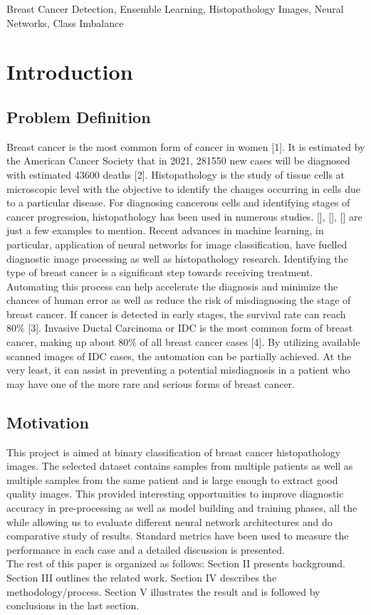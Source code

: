 \documentclass[conference]{IEEEtran}
\begin{document}
\begin{IEEEkeywords}
  Breast Cancer Detection, Ensemble Learning, Histopathology Images,
  Neural Networks, Class Imbalance
\end{IEEEkeywords}

\section{Introduction}
\subsection{Problem Definition}
Breast cancer is the most common form of cancer in women [1]. It is estimated
by the American Cancer Society that in 2021, 281550 new cases will be diagnosed
with estimated 43600 deaths [2]. Histopathology is the study of tissue cells
at microscopic level with the objective to identify the changes occurring in
cells due to a particular disease. For diagnosing cancerous cells and
identifying stages of cancer progression, histopathology has been used in
numerous studies. [], [], [] are just a few examples to mention. Recent
advances in machine learning, in particular, application of neural networks
for image classification, have fuelled diagnostic image processing as well as
histopathology research. Identifying the type of breast cancer is a significant
step towards receiving treatment. Automating this process can help accelerate
the diagnosis and minimize the chances of human error as well as reduce the
risk of misdiagnosing the stage of breast cancer. If  cancer is detected in
early stages, the survival rate can reach 80\% [3]. Invasive Ductal Carcinoma
or IDC is the most common form of breast cancer, making up about 80\% of all
breast cancer cases [4]. By utilizing available scanned images of IDC cases,
the automation can be partially achieved. At the very least, it can assist in
preventing a potential misdiagnosis in a patient who may have one of the more
rare and serious forms of breast cancer.
\subsection{Motivation}
This project is aimed at binary classification of breast cancer histopathology
images. The selected dataset contains samples from multiple patients as well as
multiple samples from the same patient and is large enough to extract good
quality images. This provided interesting opportunities to improve diagnostic
accuracy in pre-processing as well as model building and training phases, all
the while allowing us to evaluate different neural network architectures and
do comparative study of results. Standard metrics have been used to measure the
performance in each case and a detailed discussion is presented.
\\ \indent The rest of this paper is organized as follows: Section II presents
background. Section III outlines the related work. Section IV describes the
methodology/process. Section V illustrates the result and is followed by
conclusions in the last section.
\end{document}
